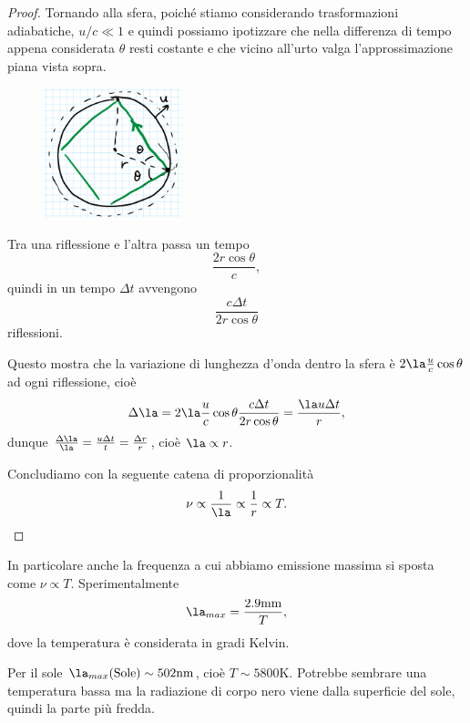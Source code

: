 \begin{proof}
\noindent Tornando alla sfera, poich\'e stiamo considerando trasformazioni adiabatiche, $u/c\ll 1$ e quindi possiamo ipotizzare che nella differenza di tempo appena considerata $\theta$ resti costante e che vicino all'urto valga l'approssimazione piana vista sopra.

\begin{figure}[!htb]
    \centering
    \includegraphics[width=4cm]{images/riflessione_interna_a_sfera.png}
\end{figure}

\noindent
Tra una riflessione e l'altra passa un tempo
\[\frac{2r\cos\theta}c,\]
quindi in un tempo $\Delta t$ avvengono
\[\frac{c\Delta t}{2r\cos\theta}\]
riflessioni.

\noindent
Questo mostra che la variazione di lunghezza d'onda dentro la sfera \`e $2\la\frac uc\cos \theta$ ad ogni riflessione, cio\`e
\[\Delta \la=2\la\frac uc\cos \theta\frac{c\Delta t}{2r\cos \theta}=\frac{\la u\Delta t}r,\]
dunque $\frac{\Delta \la}\la=\frac{u\Delta t}t=\frac{\Delta r }r$, cio\`e $\la\propto r$.\bigskip

\noindent Concludiamo con la seguente catena di proporzionalit\`a
\[\nu\propto \frac1\la\propto \frac1r\propto T.\]
\end{proof}
\begin{remark}
In particolare anche la frequenza a cui abbiamo emissione massima si sposta come $\nu\propto T$. Sperimentalmente
\[\la_{max}=\frac{2.9\mathrm{mm}}{T},\]
dove la temperatura \`e considerata in gradi Kelvin.
\end{remark}

\begin{remark}
Per il sole $\la_{max}(\text{Sole})\sim 502\mathrm{nm}$, cio\`e $T\sim 5800\mathrm{K}$. Potrebbe sembrare una temperatura bassa ma la radiazione di corpo nero viene dalla superficie del sole, quindi la parte pi\`u fredda.
\end{remark}

